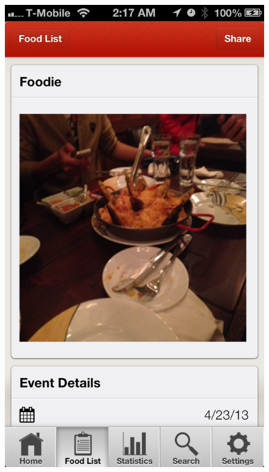 \begin{figure}
{	\includegraphics[width=\figwidth, totalheight=\figheight, keepaspectratio]{./screenshots/foodlist-detail.png}} \hfill \\
\end{figure}
